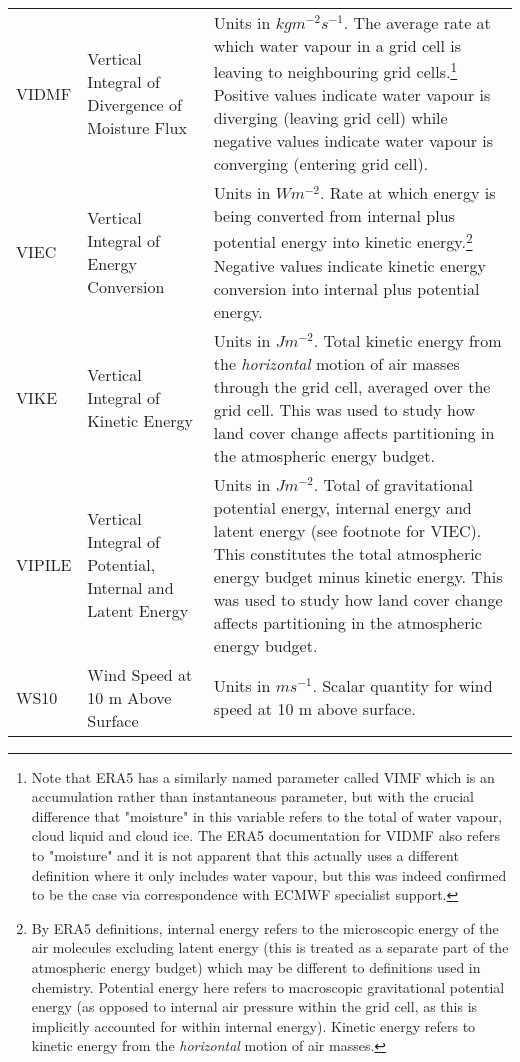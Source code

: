 \begin{landscape}
\begin{longtable}{P{2cm}P{3cm}P{13cm}}
		\acs{VIDMF} & Vertical Integral of Divergence of Moisture Flux & Units in $kg m^{-2} s^{-1}$. The average rate at which water vapour in a grid cell is leaving to neighbouring grid cells.\footnote{Note that \ac{ERA5} has a similarly named parameter called \ac{VIMF} which is an accumulation rather than instantaneous parameter, but with the crucial difference that "moisture" in this variable refers to the total of water vapour, cloud liquid and cloud ice. The ERA5 documentation for \ac{VIDMF} also refers to "moisture" and it is not apparent that this actually uses a different definition where it only includes water vapour, but this was indeed confirmed to be the case via correspondence with \ac{ECMWF} specialist support.} Positive values indicate water vapour is diverging (leaving grid cell) while negative values indicate water vapour is converging (entering grid cell). \\
		\acs{VIEC} & Vertical Integral of Energy Conversion & Units in $W m^{-2}$. Rate at which energy is being converted from internal plus potential energy into kinetic energy.\footnote{By \ac{ERA5} definitions, internal energy refers to the microscopic energy of the air molecules excluding latent energy (this is treated as a separate part of the atmospheric energy budget) which may be different to definitions used in chemistry. Potential energy here refers to macroscopic gravitational potential energy (as opposed to internal air pressure within the grid cell, as this is implicitly accounted for within internal energy). Kinetic energy refers to kinetic energy from the \textit{horizontal} motion of air masses.} Negative values indicate kinetic energy conversion into internal plus potential energy. \\
		\acs{VIKE} & Vertical Integral of Kinetic Energy & Units in $J m^{-2}$. Total kinetic energy from the \textit{horizontal} motion of air masses through the grid cell, averaged over the grid cell. This was used to study how land cover change affects partitioning in the atmospheric energy budget. \\
		\acs{VIPILE} & Vertical Integral of Potential, Internal and Latent Energy & Units in $J m^{-2}$. Total of gravitational potential energy, internal energy and latent energy (see footnote for \ac{VIEC}). This constitutes the total atmospheric energy budget minus kinetic energy. This was used to study how land cover change affects partitioning in the atmospheric energy budget. \\
		\acs{WS10} & Wind Speed at 10 m Above Surface & Units in $m s^{-1}$. Scalar quantity for wind speed at 10 m above surface. \\

\end{longtable}
\end{landscape}
